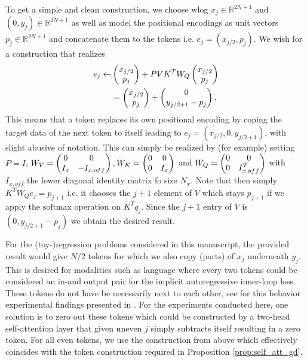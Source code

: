 \documentclass{article}
\theoremstyle{plain}
\theoremstyle{definition}
\theoremstyle{remark}
\begin{document}
To get a simple and clean construction, we choose wlog $x_j \in \mathbb{R}^{2N+1}$ and $(0, y_j) \in \mathbb{R}^{2N+1}$ as well as model the positional encodings as unit vectors $p_j \in \mathbb{R}^{2N+1}$ and  concatenate them to the tokens i.e. $e_j = (x_{j/2}, p_j)$. We wish for a construction that realizes 
\begin{align}
     e_j  \leftarrow& \left(\begin{array}{@{}c@{}}
  x_{j/2}\\
  p_j 
\end{array}\right)
 + PVK^{T}W_{Q}  \left(\begin{array}{@{}c@{}}
  x_{j/2}\\
  p_j 
\end{array}\right) \\
        &=  \left(\begin{array}{@{}c@{}}
  x_{j/2}\\
  p_j 
\end{array}\right) + \left(\begin{array}{@{}c@{}}
  0\\
   y_{j/2+1} - p_j
\end{array}\right).
\end{align}
This means that a token replaces its own positional encoding by coping the target data of the next token to itself leading to $e_j=(x_{j/2}, 0, y_{j/2+1})$, with slight abusive of notation. This can simply be realized by (for example) setting $P=I$, $W_V=\left(\begin{array}{@{}c c@{}}
  0
  & 0 \\
  I_x &
  -I_{x, off}
\end{array}\right), W_K=\left(\begin{array}{@{}c c@{}}
  0
  & 0 \\
  0 &
  I_x
\end{array}\right)$ and  $W_Q=\left(\begin{array}{@{}c c@{}}
  0
  & 0 \\
  0 &
  I_{x, off}^T
\end{array}\right)$ with $I_{x, off}$ the lower diagonal identity matrix fo size $N_x$. Note that then simply $K^TW_Qe_j=p_{j+1}$ i.e. it chooses the $j+1$ element of $V$ which stays $p_{j+1}$ if we apply the $\text{softmax}$ operation on $K^Tq_j$. Since the $j+1$ entry of $V$ is $(0, y_{j/2+1} - p_{j})$ we obtain the desired result.

For the (toy-)regression problems considered in this manuscript, the provided result would give $N/2$ tokens for which we also copy (parts) of $x_j$ underneath $y_j$. This is desired for modalities such as language where every two tokens could be considered an in-and output pair for the implicit autoregressive inner-loop loss. These tokens do not have be necessarily next to each other, see for this behavior experimental findings presented in \cite{induction_heads}. For the experiments conducted here, one solution is to zero out these tokens which could be constructed by a two-head self-attention layer that given uneven $j$ simply subtracts itself resulting in a zero token. For all even tokens, we use the construction from above which effectively coincides with the token construction required in Proposition \ref{prop:self_att_gd}.
\end{document}
